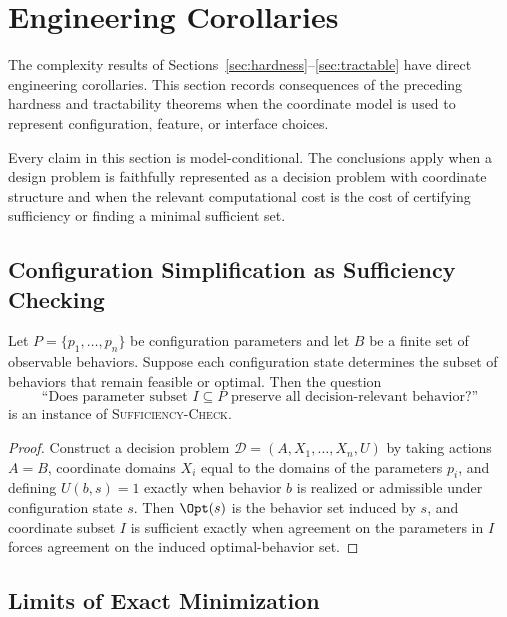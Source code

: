 \section{Engineering Corollaries}\label{sec:engineering-corollaries}

The complexity results of Sections~\ref{sec:hardness}--\ref{sec:tractable} have direct engineering corollaries. This section records consequences of the preceding hardness and tractability theorems when the coordinate model is used to represent configuration, feature, or interface choices.

Every claim in this section is model-conditional. The conclusions apply when a design problem is faithfully represented as a decision problem with coordinate structure and when the relevant computational cost is the cost of certifying sufficiency or finding a minimal sufficient set.

\subsection{Configuration Simplification as Sufficiency Checking}

\begin{proposition}
\label{prop:config-sufficiency}
Let $P=\{p_1,\ldots,p_n\}$ be configuration parameters and let $B$ be a finite set of observable behaviors. Suppose each configuration state determines the subset of behaviors that remain feasible or optimal. Then the question
\[
\text{``Does parameter subset } I \subseteq P \text{ preserve all decision-relevant behavior?''}
\]
is an instance of \textsc{Sufficiency-Check}.
\end{proposition}

\begin{proof}
Construct a decision problem $\mathcal{D}=(A,X_1,\ldots,X_n,U)$ by taking actions $A=B$, coordinate domains $X_i$ equal to the domains of the parameters $p_i$, and defining $U(b,s)=1$ exactly when behavior $b$ is realized or admissible under configuration state $s$. Then $\Opt(s)$ is the behavior set induced by $s$, and coordinate subset $I$ is sufficient exactly when agreement on the parameters in $I$ forces agreement on the induced optimal-behavior set.
\end{proof}

\subsection{Limits of Exact Minimization}

